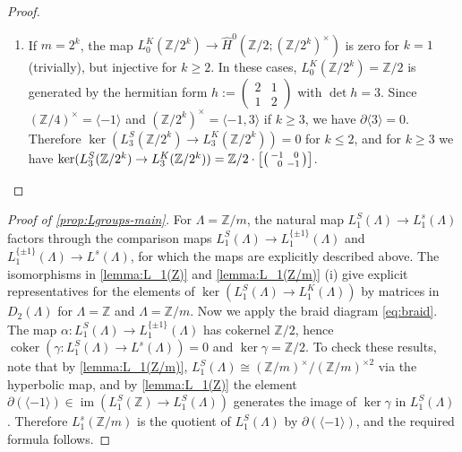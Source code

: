 \documentclass[11pt,a4paper,leqno]{amsart}
\theoremstyle{definition}
\theoremstyle{remark}
\newenvironment{clist}[1]
{\begin{enumerate}[\normalfont #1]}
{\end{enumerate}}
\newcommand{\wh}{\widehat}
\newcommand{\cy}[1]{\Z/{#1}}
\newcommand{\Z}{\mathbb{Z}}
\DeclareMathOperator{\IM}{im}
\renewcommand{\l}{\Lambda}
\newcommand{\La}{\Lambda}
\newcommand{\bZ}{\mathbb Z}
\newcommand{\bd}{\partial}
\DeclareMathOperator{\coker}{coker}
\newcommand{\la}{\langle}
\newcommand{\ra}{\rangle}
\newcommand{\sx}{\hphantom{x}}
\begin{document}
\begin{proof}
\begin{clist}{(i)}
 \item If $m = 2^k$, the map $L_0^K(\cy {2^k}) \to \wh H^0(\cy 2;(\cy{2^k})^\times)$ is zero for $k=1$ (trivially), but injective for $k \geq 2$. In these cases, $L_0^K(\cy {2^k}) = \cy 2$ is generated by the hermitian form $h :=\left(\begin{smallmatrix} 2 &1 \\  1 & 2 \end{smallmatrix}\right) $ with $\det h = 3$. Since $(\cy{4})^\times = \la -1\ra$ and $(\cy{2^k})^\times = \la -1, 3\ra$ if $k \geq 3$,  we have $\bd \la 3\ra = 0$. Therefore $\ker(L_3^S(\cy{2^k}) \to L_3^K(\cy{2^k})) = 0$ for $k \leq 2$, and for $k \geq 3$ we have
 $\ker(L_3^S(\cy{2^k}) \to L_3^K(\cy{2^k})) = \Z/2 \cdot \left[ \left(\begin{smallmatrix} -1 &\sx 0 \\ \sx 0 & -1 \end{smallmatrix}\right) \right ]$. \qedhere
\end{clist}
\end{proof}

\begin{proof}[Proof of \cref{prop:Lgroups-main}] For $\La = \cy m$, 
the natural map $L^S_{1}(\La) \to L^s_{1}(\La)$ factors through the comparison maps
 $L^S_{1}(\La) \to L^{\{\pm 1\}}_{1}(\La)$ and  $L^{\{\pm 1\}}_{1}(\La) \to L^s_{}(\La)$, for which the maps are explicitly described above. 
 The isomorphisms in \cref{lemma:L_1(Z)} and \cref{lemma:L_1(Z/m)} (i) give explicit representatives for the elements of $\ker(L_{1}^S(\l) \to L_{1}^K(\l))$ by matrices in $D_2(\l)$ for $\La = \bZ$ and $\La = \cy m$. Now we apply the braid diagram \eqref{eq:braid}. The map $\alpha\colon L^S_{1}(\La) \to L^{\{\pm 1\}}_{1}(\La) $ has cokernel $\cy 2$, hence 
  $\coker (\gamma\colon L^S_{1}(\La) \to L^s_{}(\La)) = 0$ and $\ker \gamma = \cy 2$.
To check these results, note that by \cref{lemma:L_1(Z/m)}, $L_1^S(\La) \cong (\Z/ m)^\times/(\Z/ m)^{\times 2}$ via the hyperbolic map, and by \cref{lemma:L_1(Z)} the element 
$\bd (\la -1\ra) \in \IM(L_1^S(\bZ) \to L_1^S(\La))$ generates the image of $\ker\gamma$ in $L_1^S(\La)$.  Therefore  $L_1^s(\cy m)$ is the quotient of $L_1^S(\La)$  by $\bd (\la -1\ra)$, and the required formula  follows.  \end{proof}
\end{document}
